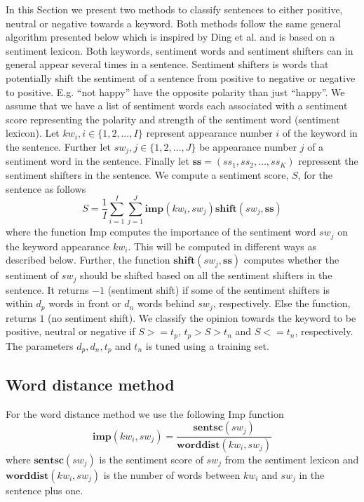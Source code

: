 \documentclass[11pt]{article}
\begin{document}
In this Section we present two methods to classify sentences to either positive, neutral or negative towards a keyword. Both methods follow the same general algorithm presented below which is inspired by Ding et al.  and is based on a sentiment lexicon. Both keywords, sentiment words and sentiment shifters can in general appear several times in a sentence. Sentiment shifters is words that potentially shift the sentiment of a sentence from positive to negative or negative to positive. E.g. ``not happy'' have the opposite polarity than just ``happy''. We assume that we have a list of sentiment words each associated with a sentiment score representing the polarity and strength of the sentiment word (sentiment lexicon). Let $kw_i, i \in \{1,2,\ldots,I\}$ represent appearance number $i$ of the keyword in the sentence. Further let $sw_{j}, j \in \{1,2,\ldots,J\}$ be appearance number $j$ of a sentiment word in the sentence. Finally let $\textbf{ss} = (ss_1, ss_2, \ldots, ss_K)$ repressent the sentiment shifters in the sentence. We compute a sentiment score, $S$, for the sentence as follows
\begin{equation}
  \label{eq:1}
  S = \frac{1}{I}\sum_{i=1}^{I} \sum_{j=1}^{J} \mathbf{imp}(kw_i, sw_{j})\mathbf{shift}(sw_{j}, \mathbf{ss})    
\end{equation}
where the function Imp computes the importance of the sentiment word $sw_{j}$ on the keyword appearance $kw_i$. This will be computed in different ways as described below. Further, the function $\mathbf{shift}(sw_{j}, \mathbf{ss})$ computes whether the sentiment of $sw_{j}$ should be shifted based on all the sentiment shifters in the sentence. It returns $-1$ (sentiment shift) if some of the sentiment shifters is within $d_{p}$ words in front or $d_{n}$ words behind $sw_{j}$, respectively. Else the function, returns $1$ (no sentiment shift). We classify the opinion towards the keyword to be positive, neutral or negative if $S >= t_p$,  $t_p > S > t_n$ and  $S <= t_n$, respectively. The parameters $d_p, d_n, t_p$ and $t_n$ is tuned using a training set.

\subsection{Word distance method}
\label{sec:wd}

For the word distance method we use the following Imp function
\begin{equation}
  \label{eq:2}
  \mathbf{imp}(kw_i, sw_{j}) = \frac{\mathbf{sentsc}(sw_{j})}{\mathbf{worddist}(kw_i, sw_{j})}
\end{equation}
where $\mathbf{sentsc}(sw_{j})$ is the sentiment score of $sw_{j}$ from the sentiment lexicon and $\mathbf{worddist}(kw_i, sw_{j})$ is the number of words between $kw_i$ and $sw_{j}$ in the sentence plus one.
\end{document}

